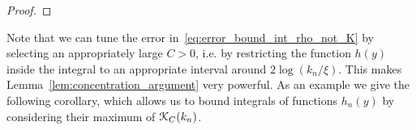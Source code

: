 \begin{appendices}
\begin{proof}
\end{proof}

Note that we can tune the error in~\eqref{eq:error_bound_int_rho_not_K} by selecting an appropriately large $C > 0$, i.e. by restricting the function $h(y)$ inside the integral to an appropriate interval around $2\log(k_n/\xi)$. This makes Lemma~\ref{lem:concentration_argument} very powerful. As an example we give the following corollary, which allows us to bound integrals of functions $h_n(y)$ by considering their maximum of ${\mathcal K}_{C}(k_n)$.

%


\end{appendices}
